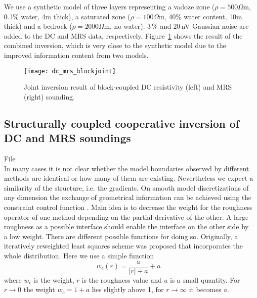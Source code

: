 We use a synthetic model of three layers representing a vadoze zone ($\rho=500\Omega$m, 0.1\% water, 4m thick), a saturated zone ($\rho=100\Omega$m, 40\% water content, 10m thick) and a bedrock ($\rho=2000\Omega$m, no water).
3\,\% and 20\,nV Gaussian noise are added to the DC and MRS data, respectively.
Figure~\ref{fig:blockjoint} shows the result of the combined inversion, which is very close to the synthetic model due to the improved information content from two models.

\begin{figure}[htb]
\centering\texttt{[image: dc\_mrs\_blockjoint]}
\caption{Joint inversion result of block-coupled DC resistivity (left) and MRS (right) sounding.}\label{fig:blockjoint}
\end{figure}


\subsection{Structurally coupled cooperative inversion of DC and MRS soundings}\label{sec:structjoint}
File \\
In many cases it is not clear whether the model boundaries observed by different methods are identical or how many of them are existing.
Nevertheless we expect a similarity of the structure, i.e. the gradients.
On smooth model discretizations of any dimension the exchange of geometrical information can be achieved using the constraint control function \citep{guerue06nearsurface}.
Main idea is to decrease the weight for the roughness operator of one method depending on the partial derivative of the other.
A large roughness as a possible interface should enable the interface on the other side by a low weight.
There are different possible functions for doing so.
Originally, a iteratively reweighted least squares scheme was proposed that incorporates the whole distribution.
Here we use a simple function
\begin{equation}
    w_c(r) = \frac{a}{|r|+a}+a
\end{equation}
where $w_c$ is the weight, $r$ is the roughness value and $a$ is a small quantity.
For $r\rightarrow 0$ the weight $w_c=1+a$ lies slightly above 1, for $r\rightarrow\infty$ it becomes $a$.

